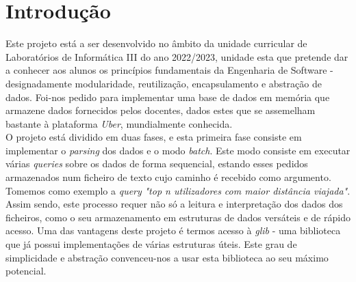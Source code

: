 \documentclass[12pt,a4paper]{report}
\begin{document}
    \chapter{Introdução}
    Este projeto está a ser desenvolvido no âmbito da unidade curricular de Laboratórios de Informática III do ano 2022/2023, unidade esta que pretende dar a conhecer aos alunos os princípios fundamentais da Engenharia de Software - designadamente modularidade, reutilização, encapsulamento e abstração de dados. Foi-nos pedido para implementar uma base de dados em memória que armazene dados fornecidos pelos docentes, dados estes que se assemelham bastante à plataforma \textit{Uber}, mundialmente conhecida. \\
    O projeto está dividido em duas fases, e esta primeira fase consiste em implementar o \textit{parsing} dos dados e o modo \textit{batch}. Este modo consiste em executar várias \textit{queries} sobre os dados de forma sequencial, estando esses pedidos armazenados num ficheiro de texto cujo caminho é recebido como argumento. Tomemos como exemplo a \textit{query} \textit{"top n utilizadores com maior distância viajada"}. \\
    Assim sendo, este processo requer não só a leitura e interpretação dos dados dos ficheiros, como o seu armazenamento em estruturas de dados versáteis e de rápido acesso. Uma das vantagens deste projeto é termos acesso à \textit{glib} - uma biblioteca que já possui implementações de várias estruturas úteis. Este grau de simplicidade e abstração convenceu-nos a usar esta biblioteca ao seu máximo potencial.
 
\newpage
	
\end{document}
